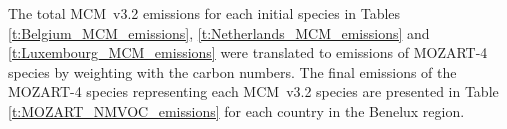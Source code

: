 {%
    \begin{landscape}%
        \centering%
        
    \end{landscape}%
}

{%
    \begin{landscape}%
        \centering%
        
    \end{landscape}%
}

{%
    \begin{landscape}%
        \centering%
        
    \end{landscape}%
}

{%
    \centering%
    
}
The total MCM~v3.2 emissions for each initial species in Tables \ref{t:Belgium_MCM_emissions}, \ref{t:Netherlands_MCM_emissions} and \ref{t:Luxembourg_MCM_emissions} were translated to emissions of MOZART-4 species by weighting with the carbon numbers. The final emissions of the MOZART-4 species representing each MCM~v3.2 species are presented in Table \ref{t:MOZART_NMVOC_emissions} for each country in the Benelux region.

